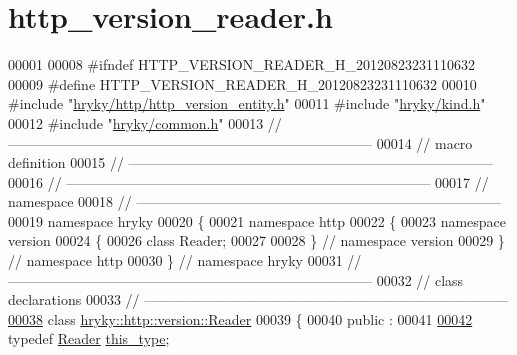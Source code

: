\hypertarget{http__version__reader_8h_source}{\section{http\-\_\-version\-\_\-reader.\-h}
}

\begin{DoxyCode}
00001 
00008 \textcolor{preprocessor}{#ifndef HTTP\_VERSION\_READER\_H\_20120823231110632}
00009 \textcolor{preprocessor}{}\textcolor{preprocessor}{#define HTTP\_VERSION\_READER\_H\_20120823231110632}
00010 \textcolor{preprocessor}{}\textcolor{preprocessor}{#include "\hyperlink{http__version__entity_8h}{hryky/http/http_version_entity.h}"}
00011 \textcolor{preprocessor}{#include "\hyperlink{kind_8h}{hryky/kind.h}"}
00012 \textcolor{preprocessor}{#include "\hyperlink{common_8h}{hryky/common.h}"}
00013 \textcolor{comment}{//
      ------------------------------------------------------------------------------}
00014 \textcolor{comment}{// macro definition}
00015 \textcolor{comment}{//
      ------------------------------------------------------------------------------}
00016 \textcolor{comment}{//
      ------------------------------------------------------------------------------}
00017 \textcolor{comment}{// namespace}
00018 \textcolor{comment}{//
      ------------------------------------------------------------------------------}
00019 \textcolor{keyword}{namespace }hryky
00020 \{
00021 \textcolor{keyword}{namespace }http
00022 \{
00023 \textcolor{keyword}{namespace }version
00024 \{
00026     \textcolor{keyword}{class }Reader;
00027 
00028 \} \textcolor{comment}{// namespace version}
00029 \} \textcolor{comment}{// namespace http}
00030 \} \textcolor{comment}{// namespace hryky}
00031 \textcolor{comment}{//
      ------------------------------------------------------------------------------}
00032 \textcolor{comment}{// class declarations}
00033 \textcolor{comment}{//
      ------------------------------------------------------------------------------}
\hypertarget{http__version__reader_8h_source_l00038}{}\hyperlink{classhryky_1_1http_1_1version_1_1_reader}{00038} \textcolor{comment}{}\textcolor{keyword}{class }\hyperlink{classhryky_1_1http_1_1version_1_1_reader}{hryky::http::version::Reader}
00039 \{
00040 \textcolor{keyword}{public} :
00041 
\hypertarget{http__version__reader_8h_source_l00042}{}\hyperlink{classhryky_1_1http_1_1version_1_1_reader_a75064c5aa31f02adcbdd0b6b255c5a73}{00042}     \textcolor{keyword}{typedef} \hyperlink{classhryky_1_1http_1_1version_1_1_reader}{Reader} \hyperlink{classhryky_1_1http_1_1version_1_1_reader_a75064c5aa31f02adcbdd0b6b255c5a73}{this_type};

\end{DoxyCode}
